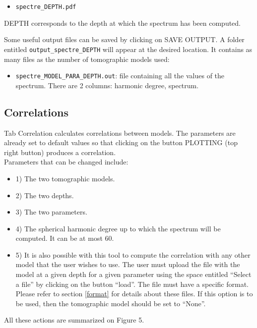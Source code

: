 \documentclass[12pt]{article}
\providecommand{\tightlist}{%
      \setlength{\itemsep}{0pt}\setlength{\parskip}{0pt}}
\begin{document}
\begin{itemize}
\tightlist
\item
  \verb?spectre_DEPTH.pdf?
\end{itemize}
DEPTH corresponds to the depth at which the spectrum has been computed.

Some useful output files can be saved by clicking on SAVE OUTPUT. A
folder entitled \verb?output_spectre_DEPTH? will appear at the desired
location. It contains as many files as the number of tomographic models
used:

\begin{itemize}
\tightlist
\item
  \verb?spectre_MODEL_PARA_DEPTH.out?: file containing all the values of the
  spectrum. There are 2 columns: harmonic degree, spectrum.
\end{itemize}

\subsection{Correlations}\label{corrpy}

Tab Correlation calculates correlations between models.  The parameters are
already set to default values so that clicking on the
button PLOTTING (top right button) produces a correlation.\\

Parameters that can be changed include: 
\begin{itemize}
\item 1) The two tomographic models.
 \item 2)  The two depths.
  \item 3) The two parameters.
   \item 4)   The spherical harmonic degree up to which the spectrum will be
    computed. It can be at most 60.
 \item 5)    It is also possible with this tool to compute the correlation with
    any other model that the user wishes to use. The user must upload
    the file with the model at a given depth for a given parameter using
    the space entitled ``Select a file'' by clicking on the button
    ``load''.  The file must have a specific format. Please refer to  section \ref{format} for details about these files. If this option is to be
    used, then the tomographic model should be set to ``None''.
\end{itemize}
All these actions are summarized  on Figure 5.
\end{document}
